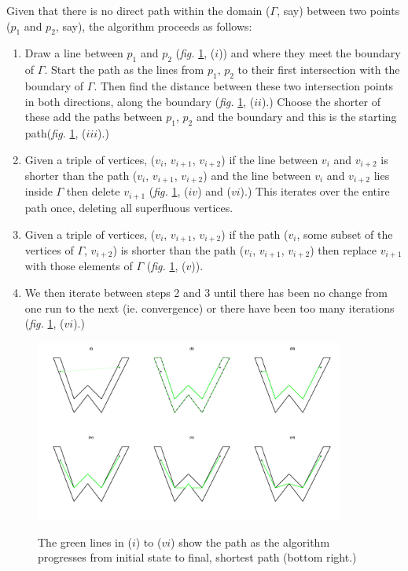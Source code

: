 \documentclass[a4paper,10pt]{article}
\newcommand{\fig}[1]{\emph{fig.} \ref{#1}}
\begin{document}
Given that there is no direct path within the domain ($\Gamma$, say) between two points ($p_1$ and $p_2$, say), the algorithm proceeds as follows:

\begin{enumerate}
\item Draw a line between $p_1$ and $p_2$ (\fig{wdia}, ($i$)) and where they meet the boundary of $\Gamma$. Start the path as the lines from $p_1$, $p_2$ to their first intersection with the boundary of $\Gamma$. Then find the distance between these two intersection points in both directions, along the boundary (\fig{wdia}, ($ii$).) Choose the shorter of these add the paths between $p_1$, $p_2$ and the boundary and this is the starting path(\fig{wdia}, ($iii$).) 
\item Given a triple of vertices, ($v_i$, $v_{i+1}$, $v_{i+2}$) if the line between $v_i$ and $v_{i+2}$ is shorter than the path ($v_i$, $v_{i+1}$, $v_{i+2}$) and the line between $v_i$ and $v_{i+2}$ lies inside $\Gamma$ then delete $v_{i+1}$ (\fig{wdia}, ($iv$) and ($vi$).) This iterates over the entire path once, deleting all superfluous vertices. 
\item Given a triple of vertices, ($v_i$, $v_{i+1}$, $v_{i+2}$) if the path ($v_i$, some subset of the vertices of $\Gamma$, $v_{i+2}$) is shorter than the path ($v_i$, $v_{i+1}$, $v_{i+2}$) then replace $v_{i+1}$ with those elements of $\Gamma$ (\fig{wdia}, ($v$)). 
\item We then iterate between steps 2 and 3 until there has been no change from one run to the next (ie. convergence) or there have been too many iterations (\fig{wdia}, ($vi$).)
\end{enumerate}

\begin{figure}
\centering
\includegraphics[trim=0in 0.5in 0in 0.25in, width=4in]{figs/wdia.pdf} \\
\caption{The green lines in ($i$) to ($vi$) show the path as the algorithm progresses from initial state to final, shortest path (bottom right.) }
\label{wdia}
\end{figure}
\end{document}
